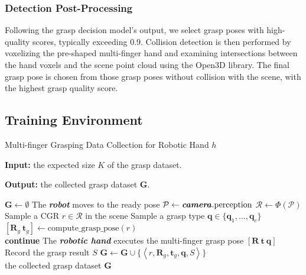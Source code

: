 \subsubsection*{Detection Post-Processing}
\label{detection post processing}
Following the grasp decision model's output, we select grasp poses with high-quality scores, typically exceeding 0.9. Collision detection is then performed by voxelizing the pre-shaped multi-finger hand and examining intersections between the hand voxels and the scene point cloud using the Open3D library. The final grasp pose is chosen from those grasp poses without collision with the scene, with the highest grasp quality score.




\subsection{Training Environment}

\begin{algorithm}[!t]
\caption{Multi-finger Grasping Data Collection for Robotic Hand $h$}\label{alg:anyhand-learn}

\textbf{Input:} the expected size $K$ of the grasp dataset.

\textbf{Output:} the collected grasp dataset $\mathbf{G}$.

\begin{algorithmic}[1]
\State $\mathbf{G} \leftarrow \emptyset$
\State The \textbf{\textit{robot}} moves to the ready pose
\State $\mathcal{P} \leftarrow \textbf{\textit{camera}}.\text{perception}$ \Comment{\textcolor{darkgrey}{capture RGBD images and transform into point cloud}}
\State $\mathcal{R} \leftarrow \Phi (\mathcal{P})$ \Comment{\textcolor{darkgrey}{generate scene representation from the point cloud}} %
\State Sample a CGR $r \in \mathcal{R}$ in the scene
\State Sample a grasp type $\mathbf{q} \in \{\mathbf{q}_1,...,\mathbf{q}_c\}$
\State $[\mathbf{R}_g\ \mathbf{t}_g]\leftarrow\text{compute\_grasp\_pose}(r)$
\Comment{\textcolor{darkgrey}{Map CGR to the grasp pose}}
 \\\Comment{\textcolor{darkgrey}{Check if the multi-finger grasp pose will collide with the scene point cloud}}
\State \textbf{continue}
\EndIf
\State The \textbf{\textit{robotic hand}} executes the multi-finger grasp pose $[\mathbf{R}\ \mathbf{t}\ \mathbf{q}]$
\State Record the grasp result $S$ \Comment{\textcolor{darkgrey}{Collect trial-and-error results}}
\State $\mathbf{G} \leftarrow \mathbf{G} \cup \{\left<r, \mathbf{R}_g, \mathbf{t}_g, \mathbf{q}, S\right>\}$
\EndWhile \\
\Return the collected grasp dataset $\mathbf{G}$
\end{algorithmic}
\label{alg_datacollection}
\end{algorithm}

